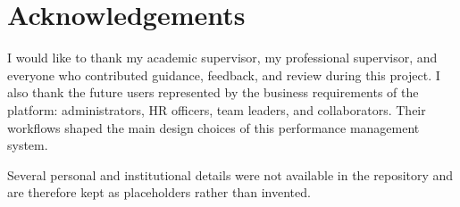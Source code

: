 \chapter*{Acknowledgements}
I would like to thank my academic supervisor, my professional supervisor, and everyone who contributed guidance, feedback, and review during this project. I also thank the future users represented by the business requirements of the platform: administrators, HR officers, team leaders, and collaborators. Their workflows shaped the main design choices of this performance management system.

Several personal and institutional details were not available in the repository and are therefore kept as placeholders rather than invented.
\clearpage
